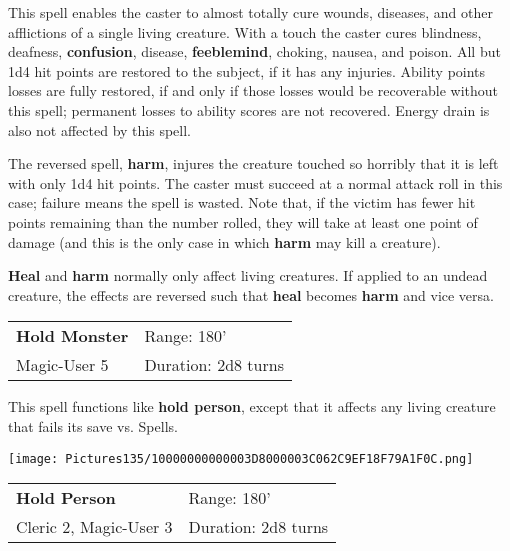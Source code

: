 \documentclass[a4paper,twoside,openany,10pt]{book}
\begin{document}
\begin{multicols}{2}
This spell enables the caster to almost totally cure wounds, diseases, and other afflictions of a single living creature. With a touch the caster cures blindness, deafness, \textbf{confusion}, disease, \textbf{feeblemind}, choking, nausea, and poison. All but 1d4 hit points are restored to the subject, if it has any injuries. Ability points losses are fully restored, if and only if those losses would be recoverable without this spell; permanent losses to ability scores are not recovered. Energy drain is also not affected by this spell.

The reversed spell, \textbf{harm}, injures the creature touched so horribly that it is left with only 1d4 hit points. The caster must succeed at a normal attack roll in this case; failure means the spell is wasted. Note that, if the victim has fewer hit points remaining than the number rolled, they will take at least one point of damage (and this is the only case in which \textbf{harm} may kill a creature).

\textbf{Heal} and \textbf{harm} normally only affect living creatures. If applied to an undead creature, the effects are reversed such that \textbf{heal} becomes \textbf{harm} and vice versa.


\smallskip\begin{flushleft} 
	\begin{tabularx}{0.45\textwidth}{@{}m{3.5cm}m{5.5cm}@{}} 
		\textbf{Hold Monster} & Range: 180'\\
Magic-User 5 &Duration: 2d8 turns\\
	\end{tabularx}\end{flushleft}

This spell functions like \textbf{hold person}, except that it affects any living creature that fails its save vs. Spells.


\begin{flushleft}
	\texttt{[image: Pictures135/10000000000003D8000003C062C9EF18F79A1F0C.png]}
\end{flushleft}


\smallskip\begin{flushleft} 
	\begin{tabularx}{0.45\textwidth}{@{}m{3.5cm}m{5.5cm}@{}} 
		\textbf{Hold Person} & Range: 180'\\
Cleric 2, Magic-User 3 & Duration: 2d8 turns\\
	\end{tabularx}\end{flushleft}


\end{multicols}
\end{document}
